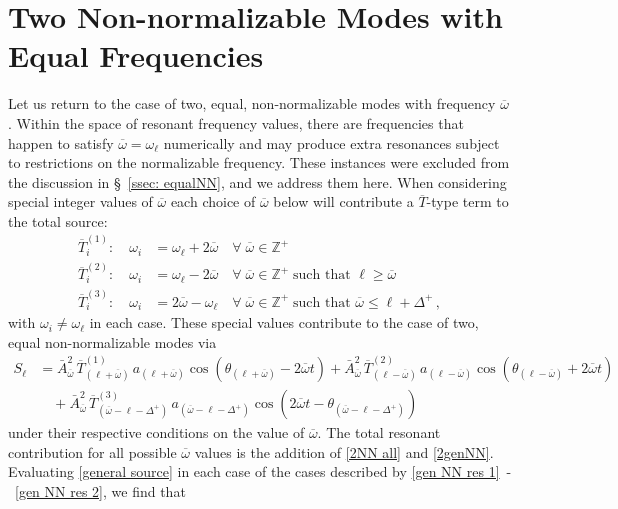\documentclass[letterpaper,11pt]{article}
\newcommand{\ol}{\omega_\ell}
\newcommand{\ob}{\overline{\omega}}
\begin{document}

\section{Two Non-normalizable Modes with Equal Frequencies}
\label{more 2NN}
Let us return to the case of two, equal, non-normalizable modes with frequency $\ob$. Within the space of resonant frequency values, there are frequencies that happen to satisfy $\ob = \ol$ numerically and may produce extra resonances subject to restrictions on the normalizable frequency. These instances were excluded from the discussion in \S\!~\ref{ssec: equalNN}, and we address them here. When considering special integer values of $\ob$ each choice of $\ob$ below will contribute a $\overline T$-type term to the total source:
\begin{align}
\label{gen NN res 1}
\overline{T}^{(1)}_{i}: \quad \omega_i &= \ol + 2\ob \quad \forall \; \ob \in \mathbb{Z}^+ \\
\overline{T}^{(2)}_{i}: \quad \omega_i &= \ol - 2\ob \quad \forall \; \ob \in \mathbb{Z}^+ \; \text{such that } \ell \geq \ob \\
\label{gen NN res 2}
\overline{T}^{(3)}_{i}: \quad \omega_i &= 2\ob - \ol \quad \forall \; \ob \in \mathbb{Z}^+ \; \text{such that } \ob \leq \ell + \Delta^+ \, ,
\end{align}
with $\omega_i \neq \omega_\ell$ in each case. These special values contribute to the case of two, equal non-normalizable modes via
\begin{align}
\label{2NN all}
S_\ell &= \bar A^2_{\ob} \, \overline{T}^{(1)}_{(\ell + \ob)} \, a_{(\ell + \ob)} \cos \left( \theta_{(\ell + \ob)} - 2\ob t \right) + \bar A^2_{\ob} \, \overline{T}^{(2)}_{(\ell - \ob)} \, a_{(\ell - \ob)}\cos \left( \theta_{(\ell - \ob)} + 2\ob t \right) \nonumber \\
& \quad + \bar A^2_{\ob} \, \overline{T}^{(3)}_{(\ob - \ell - \Delta^+)} \, a_{(\ob - \ell- \Delta^+)} \cos \left( 2\ob t - \theta_{(\ob - \ell - \Delta^+)} \right) 
\end{align}
under their respective conditions on the value of $\ob$. The total resonant contribution for all possible $\ob$ values is the addition of \eqref{2NN all} and \eqref{2genNN}. 
Evaluating \eqref{general source} in each case of the cases described by \eqref{gen NN res 1}~\!-~\!\eqref{gen NN res 2}, we find that
\end{document}

